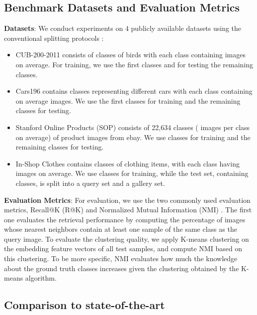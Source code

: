 \documentclass{article}
\begin{document}
\subsection{Benchmark Datasets and Evaluation Metrics}

\textbf{Datasets}: We conduct experiments on 4 publicly available datasets using the conventional splitting protocols \cite{DBLP:conf/cvpr/SongXJS16}:
\begin{itemize}
\item
CUB-200-2011 \cite{WahCUB_200_2011} consists of  classes of birds with each class containing  images on average. For training, we use the first  classes and for testing the remaining classes.
\item
Cars196 \cite{KrauseStarkDengFei-Fei_3DRR2013} contains  classes representing different cars with each class containing on average  images. We use the first  classes for training and the remaining classes for testing.
\item
Stanford Online Products (SOP) \cite{DBLP:conf/cvpr/SongXJS16} consists of 22,634 classes  ( images per class on average) of product images from ebay. We use  classes for training and the remaining  classes for testing. 
\item
In-Shop Clothes \cite{DBLP:conf/cvpr/LiuLQWT16} contains  classes of clothing items, with each class having  images on average. We use  classes for training, while the test set, containing  classes, is split into a query set and a gallery set.
\end{itemize}


\textbf{Evaluation Metrics}: For evaluation, we use the two commonly used evaluation metrics, Recall@K (R@K) \cite{DBLP:journals/pami/JegouDS11} and Normalized Mutual Information (NMI) \cite{DBLP:journals/corr/abs-1110-2515}. The first one evaluates the retrieval performance by computing the percentage of images whose  nearest neighbors contain at least one sample of the same class as the query image. To evaluate the clustering quality, we apply K-means clustering \cite{MacQueen} on the embedding feature vectors of all test samples, and compute NMI based on this clustering. To be more specific, NMI evaluates how much the knowledge about the ground truth classes increases given the clustering obtained by the K-means algorithm. 



\subsection{Comparison to state-of-the-art}
\label{subsec:ComparisonSOTA}
\end{document}
